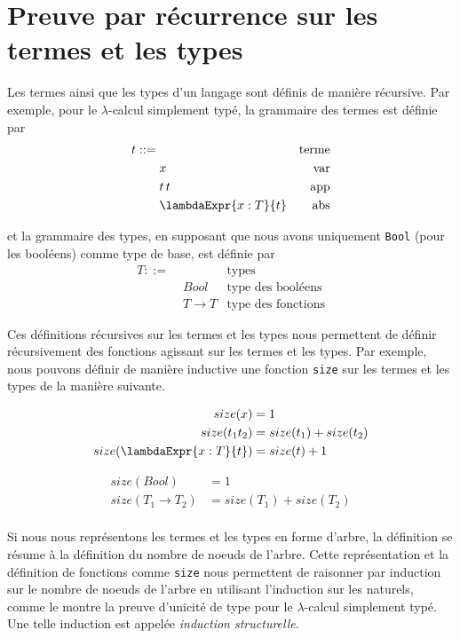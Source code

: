 \appendix
\chapter{Preuve par récurrence sur les termes et les types}

Les termes ainsi que les types d'un langage sont définis de manière récursive.
Par exemple, pour le $\lambda$-calcul simplement typé, la grammaire des termes
est définie par
\begin{align*}
  t ::= & \, & \text{terme} \\
        & \; x & \text{var} \\
        & \; t \, t & \text{app} \\
        & \; \lambdaExpr{x : T}{t} & \text{abs}
\end{align*}

et la grammaire des types, en supposant que nous avons uniquement \verb|Bool|
(pour les booléens) comme type de base, est définie par
\begin{align*}
  T ::= & \, & \text{types} \\
        & \; Bool & \text{type des booléens} \\
        & \; T \rightarrow T & \text{type des fonctions}
\end{align*}

Ces définitions récursives sur les termes et les types nous permettent de
définir récursivement des fonctions agissant sur les termes et les types. Par
exemple, nous pouvons définir de manière inductive une fonction
\verb|size| sur les termes et les types de la manière suivante.

\begin{align*}
  size(x) & = 1 \\
  size(t_{1} t_{2}) & = size(t_{1}) + size(t_{2}) \\
  size(\lambdaExpr{x : T}{t}) & = size(t) + 1
\end{align*}

\begin{align*}
  size(Bool) & = 1 \\
  size(T_{1} \rightarrow T_{2}) & = size(T_{1}) + size(T_{2}) \\
\end{align*}

Si nous nous représentons les termes et les types en forme d'arbre, la
définition se résume à la définition du nombre de noeuds de l'arbre. Cette
représentation et la définition de fonctions comme \verb|size| nous permettent de
raisonner par induction sur le nombre de noeuds de l'arbre en utilisant l'induction sur
les naturels, comme le montre la preuve d'unicité de type pour le
$\lambda$-calcul simplement typé. Une telle induction est appelée
\textit{induction structurelle}.


